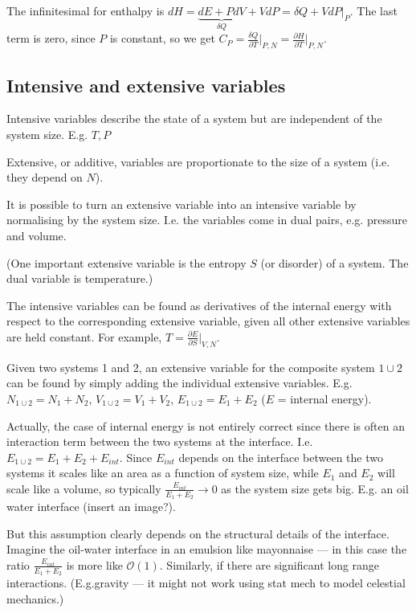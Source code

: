 The infinitesimal for enthalpy is $dH = \underbrace{dE +PdV}_{\delta Q}+ VdP = \delta Q + VdP\vert_{P}$. The last term is zero, since $P$ is constant, so we get $C_P = \frac{\delta Q}{\partial T}\vert_{P,N} = \frac{\partial H}{\partial T}\vert_{P,N} $.

\subsection*{Intensive and extensive variables}

Intensive variables  describe the state of a system but are independent of the system size. E.g. $T,P$

Extensive, or additive, variables are proportionate to the size of a system (i.e. they depend on $N$).

It is possible to turn an extensive variable into an intensive variable by normalising by the system size. I.e. the variables come in dual pairs, e.g. pressure and volume.

(One important extensive variable is the entropy $S$ (or disorder) of a system. The dual variable is temperature.)

The intensive variables  can be found as derivatives of the internal energy with respect to the corresponding extensive variable, given all other extensive variables are held constant. For example, $T = \frac{\partial E}{\partial S}\vert_{V,N}$.

Given two systems 1 and 2, an extensive variable for the composite system $1\cup2$ can be found by simply adding the individual extensive variables. E.g. $N_{1\cup2} = N_1 + N_2$, $V_{1\cup2} = V_1 + V_2$, $E_{1\cup2} = E_1 + E_2$ ($E$ = internal energy).

Actually, the case of internal energy is not entirely correct since there is often an interaction term between the two systems at the interface. I.e. $E_{1\cup2} = E_1+E_2+E_{int}$. Since $E_{int}$ depends on the interface between the two systems it scales like an area as a function of system size, while $E_1$ and $E_2$ will scale like a volume, so typically $\frac{E_{int}}{E_1+E_2}\rightarrow0$ as the system size gets big. E.g. an oil water interface (insert an image?).

But this assumption clearly depends on the structural details of the interface. Imagine the oil-water interface in an emulsion like mayonnaise --- in this case the ratio  $\frac{E_{int}}{E_1+E_2}$ is more like $\mathcal{O}(1)$.
Similarly, if there are significant long range interactions. (E.g.gravity --- it might not work using stat mech to model celestial mechanics.)

